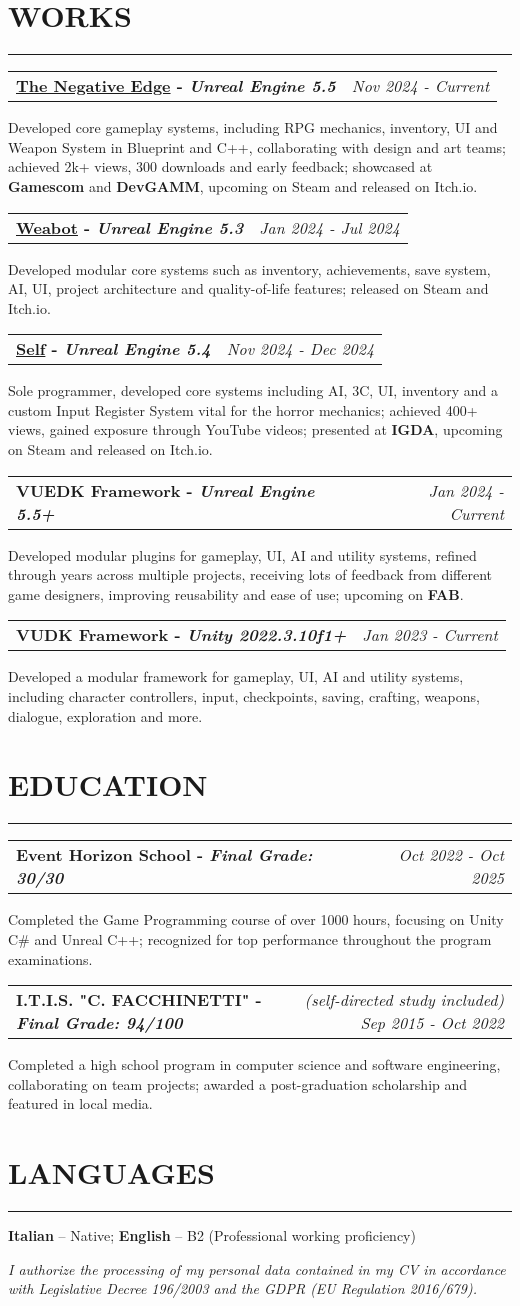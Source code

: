 \documentclass[7pt]{article}
\makeatletter
\newcommand{\sectionline}{\vspace{-0.3em}\noindent\rule{\linewidth}{0.15pt}\vspace{0.08em}}
\newcommand{\project}[3]{%
    \noindent
    \begin{tabular*}{\textwidth}{@{\extracolsep{\fill}} l r}
    \textbf{#1} & \textit{#2} \\
    \end{tabular*}
    \vspace{0.04em}
    #3
    \vspace{0.08em}\par
}
\newcommand{\cvsection}[2]{%
    \vspace{-.6em}
    \section*{{\large\textbf{\MakeUppercase{#1}}}}
    \vspace{-0.5em}
    \sectionline
    \vspace{-0.15em}
    #2
}
\newcommand{\footerdescription}[1]{%
    \vspace{-0.25em}
    \begin{center}
    \scriptsize
    \setlength{\parskip}{0pt}
    \setlength{\parindent}{0pt}
    \textit{#1}
    \end{center}
    \vspace{-0.25em}
}
\makeatother
\begin{document}
    \cvsection{WORKS}{
        \project{\href{https://eventhorizonschool.itch.io/the-negative-edge}{The Negative Edge} - \textit{Unreal Engine 5.5}}{Nov 2024 - Current}{
            Developed core gameplay systems, including RPG mechanics, inventory, UI and Weapon System in Blueprint and C++, collaborating with design and art teams;
            achieved 2k+ views, 300 downloads and early feedback;
            showcased at \textbf{Gamescom} and \textbf{DevGAMM}, upcoming on Steam and released on Itch.io.
        }
        \project{\href{https://store.steampowered.com/app/4075260/Weabot/}{Weabot} - \textit{Unreal Engine 5.3}}{Jan 2024 - Jul 2024}{
            Developed modular core systems such as inventory, achievements, save system, AI, UI, project architecture and quality-of-life features;
            released on Steam and Itch.io.
        }
        \project{\href{https://jacedxxm.itch.io/self}{Self} - \textit{Unreal Engine 5.4}}{Nov 2024 - Dec 2024}{
            Sole programmer, developed core systems including AI, 3C, UI, inventory and a custom Input Register System vital for the horror mechanics;
            achieved 400+ views, gained exposure through YouTube videos; presented at \textbf{IGDA}, upcoming on Steam and released on Itch.io.
        }
        \project{VUEDK Framework - \textit{Unreal Engine 5.5+}}{Jan 2024 - Current}{
            Developed modular plugins for gameplay, UI, AI and utility systems, refined through years across multiple projects,
            receiving lots of feedback from different game designers, improving reusability and ease of use; upcoming on \textbf{FAB}.
        }
        \project{VUDK Framework - \textit{Unity 2022.3.10f1+}}{Jan 2023 - Current}{
            Developed a modular framework for gameplay, UI, AI and utility systems, including character controllers, input, checkpoints, saving, crafting, weapons, dialogue, exploration and more.
        }
    }

    \cvsection{EDUCATION}{
        \project{Event Horizon School - \textit{Final Grade: 30/30}}{Oct 2022 - Oct 2025}{
            Completed the Game Programming course of over 1000 hours, focusing on Unity C\# and Unreal C++;
            recognized for top performance throughout the program examinations.
        }
        \project{I.T.I.S. "C. FACCHINETTI" - \textit{Final Grade: 94/100}}{(self-directed study included) Sep 2015 - Oct 2022}{
            Completed a high school program in computer science and software engineering, collaborating on team projects;
            awarded a post-graduation scholarship and featured in local media.
        }
    }

    \cvsection{LANGUAGES}{
        \textbf{Italian} – Native; \textbf{English} – B2 (Professional working proficiency)
    }

    \footerdescription{
        I authorize the processing of my personal data contained in my CV in accordance with Legislative Decree 196/2003 and the GDPR (EU Regulation 2016/679).
    }
\end{document}
